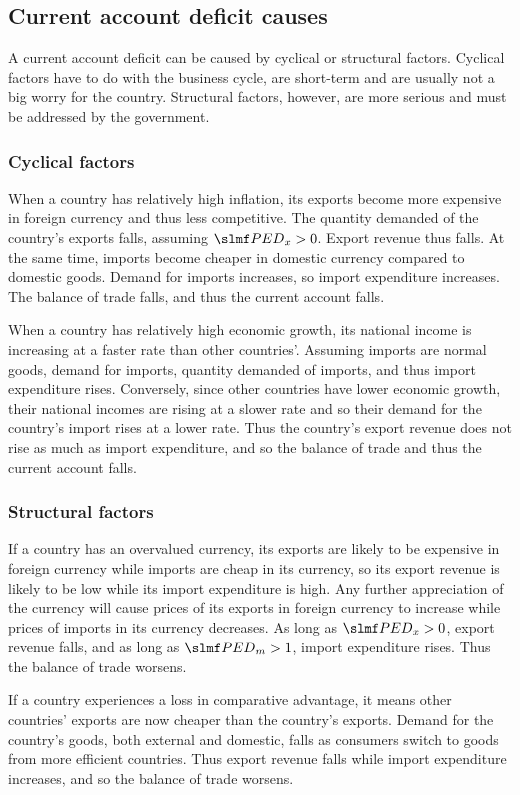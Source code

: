 \documentclass[Economics.tex]{subfiles}
\begin{document}
\subsection{Current account deficit causes}
A current account deficit can be caused by cyclical or structural factors. Cyclical factors have to do with the business cycle, are short-term and are usually not a big worry for the country. Structural factors, however, are more serious and must be addressed by the government.
\subsubsection{Cyclical factors}
When a country has relatively high inflation, its exports become more expensive in foreign currency and thus less competitive. The quantity demanded of the country's exports falls, assuming \(\PEDx{} > 0\). Export revenue thus falls. At the same time, imports become cheaper in domestic currency compared to domestic goods. Demand for imports increases, so import expenditure increases. The balance of trade falls, and thus the current account falls.

When a country has relatively high economic growth, its national income is increasing at a faster rate than other countries'. Assuming imports are normal goods, demand for imports, quantity demanded of imports, and thus import expenditure rises. Conversely, since other countries have lower economic growth, their national incomes are rising at a slower rate and so their demand for the country's import rises at a lower rate. Thus the country's export revenue does not rise as much as import expenditure, and so the balance of trade and thus the current account falls.
\subsubsection{Structural factors}
If a country has an overvalued currency, its exports are likely to be expensive in foreign currency while imports are cheap in its currency, so its export revenue is likely to be low while its import expenditure is high. Any further appreciation of the currency will cause prices of its exports in foreign currency to increase while prices of imports in its currency decreases. As long as \(\PEDx{} > 0\), export revenue falls, and as long as \(\PEDm{} > 1\), import expenditure rises. Thus the balance of trade worsens.

If a country experiences a loss in comparative advantage, it means other countries' exports are now cheaper than the country's exports. Demand for the country's goods, both external and domestic, falls as consumers switch to goods from more efficient countries. Thus export revenue falls while import expenditure increases, and so the balance of trade worsens.
\end{document}
